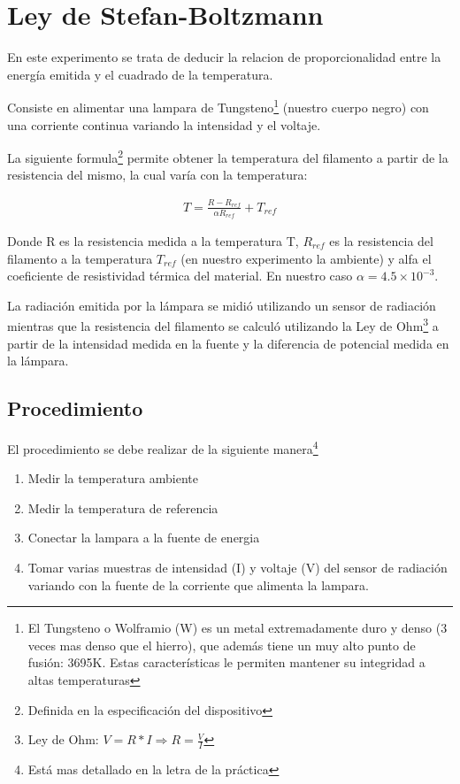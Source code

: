 \documentclass[a4paper]{article}
\begin{document}
\section{Ley de Stefan-Boltzmann}

En este experimento se trata de deducir la relacion de proporcionalidad entre la energía emitida y el cuadrado de la temperatura.

Consiste en alimentar una lampara de Tungsteno\footnote{El Tungsteno o Wolframio (W) es un metal extremadamente duro y denso (3 veces mas denso que el hierro), que además tiene un muy alto punto de fusión: 3695K. Estas características le permiten mantener su integridad a altas temperaturas} (nuestro cuerpo negro) con una corriente continua variando la intensidad y el voltaje.

La siguiente formula\footnote{Definida en la especificación del dispositivo} permite obtener la temperatura del filamento a partir de la resistencia del mismo, la cual varía con la temperatura:

\begin{align}
    T = \frac{R - R_{ref}}{\alpha R_{ref}} + T_{ref}
    \label{eq:formulaT}
\end{align}

Donde R es la resistencia medida a la temperatura T, $R_{ref}$ es la resistencia del filamento a la temperatura $T_{ref}$ (en nuestro experimento la ambiente) y alfa el coeficiente de resistividad térmica del material. En nuestro caso $\alpha = 4.5 \times 10^{−3}$.

La radiación emitida por la lámpara se midió utilizando un sensor de radiación mientras que la resistencia del filamento se calculó utilizando la Ley de Ohm\footnote{Ley de Ohm: $V = R*I \Longrightarrow R = \frac{V}{I}$} a partir de la intensidad medida en la fuente y la diferencia de potencial medida en la lámpara.

\subsection{Procedimiento}

El procedimiento se debe realizar de la siguiente manera\footnote{Está mas detallado en la letra de la práctica}

\begin{enumerate}
    \item Medir la temperatura ambiente
    \item Medir la temperatura de referencia
    \item Conectar la lampara a la fuente de energia
    \item Tomar varias muestras de intensidad (I) y voltaje (V) del sensor de radiación variando con la fuente de la corriente que alimenta la lampara.
\end{enumerate}
\end{document}
